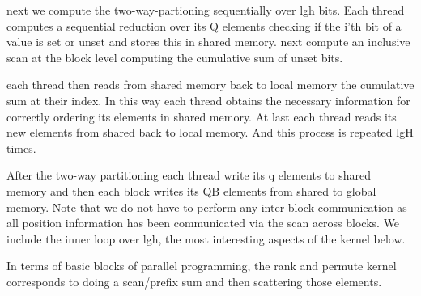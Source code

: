 \documentclass{article}
\begin{document}
next we compute the two-way-partioning sequentially over lgh bits. 
Each thread computes a sequential reduction over its Q elements checking if the i'th bit of a value is set or unset and stores this in shared memory. 
next compute an inclusive scan at the block level computing the cumulative sum of unset bits. 

each thread then reads from shared memory back to local memory the cumulative sum at their index. 
In this way each thread obtains the necessary information for correctly ordering its elements in shared memory. 
At last each thread reads its new elements from shared back to local memory. And this process is repeated lgH times.

After the two-way partitioning each thread write its q elements to shared memory and then each block writes its QB elements from shared to global memory. 
Note that we do not have to perform any inter-block communication as all position information has been communicated via the scan across blocks.
We include the inner loop over lgh, the most interesting aspects of the kernel below.

In terms of basic blocks of parallel programming, the rank and permute kernel corresponds to doing a scan/prefix sum and then scattering those elements. 
\newpage
\end{document}
